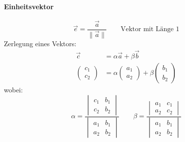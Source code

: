 \paragraph{Einheitsvektor}
\begin{equation}
  \vec{e} = \frac{\vec{a}}{\|\vec{a}\|} \qquad \text{Vektor mit L\"ange 1}
\end{equation}
Zerlegung eines Vektors:
\begin{align}
  \vec{c} & = \alpha\vec{a}+\beta\vec{b} \\
  \begin{pmatrix}c_1 \\ c_2\end{pmatrix} & = \alpha\begin{pmatrix}a_1 \\ a_2\end{pmatrix}+\beta\begin{pmatrix}b_1 \\ b_2\end{pmatrix}
\end{align}
wobei:
\begin{equation}
  \alpha=\frac{\begin{vmatrix}c_1 & b_1 \\ c_2 & b_2 \end{vmatrix}}{\begin{vmatrix}a_1 & b_1 \\ a_2 & b_2\end{vmatrix}}
  \qquad \beta=\frac{\begin{vmatrix}a_1 & c_1 \\ a_2 & c_2\end{vmatrix}}{\begin{vmatrix}a_1 & b_1 \\ a_2 & b_2\end{vmatrix}}
\end{equation}


